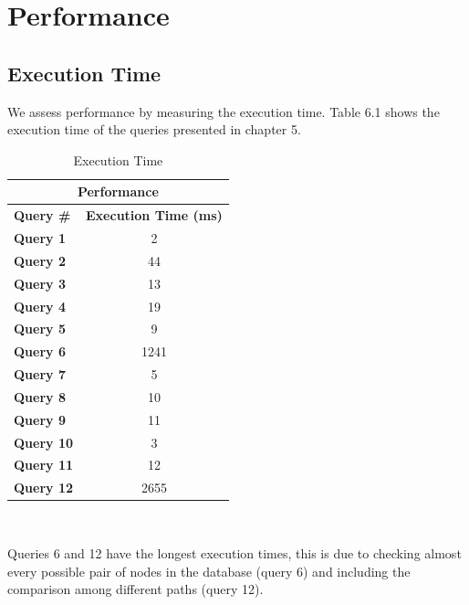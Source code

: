 \documentclass{Configuration_Files/PoliMi3i_thesis}
\begin{document}
\chapter{Performance}
\label{ch:chapter_one}%
\section{Execution Time}
We assess performance by measuring the execution time. Table 6.1 shows the execution time of the queries presented in chapter 5.\\
\begin{table}[H]
\centering 
    \begin{tabular}{|p{4.7em} | c | }
    \hline
    \multicolumn{2}{|c|}{Performance} \\ 
     \hline
      \textbf {Query \#}
     & \textbf{Execution Time (ms)}        \\
    \hline
    \textbf{Query 1} & 2 \\
    \hline
    \textbf{Query 2} & 44 \\
    \hline
    \textbf{Query 3} & 13 \T\B\\
    \hline
    \textbf{Query 4} & 19\T\B\\
    \hline
    \textbf{Query 5} & 9\T\B\\
    \hline
    \textbf{Query 6} & 1241 \T\B\\
    \hline
    \textbf{Query 7} & 5   \T\B\\
    \hline
    \textbf{Query 8} & 10  \T\B\\
    \hline
    \textbf{Query 9} & 11  \T\B\\
    \hline
    \textbf{Query 10} & 3 \T\B\\
    \hline
    \textbf{Query 11} & 12 \T\B\\  
    \hline
    \textbf{Query 12} & 2655 \T\B\\  
    \hline
    \end{tabular}
    \\[20pt]
    \caption{Execution Time}
    \label{table:exampleC}
\end{table}
Queries 6 and 12 have the longest execution times, this is due to checking almost every possible pair of nodes in the database (query 6) and including the comparison among different paths (query 12). 
\end{document}
